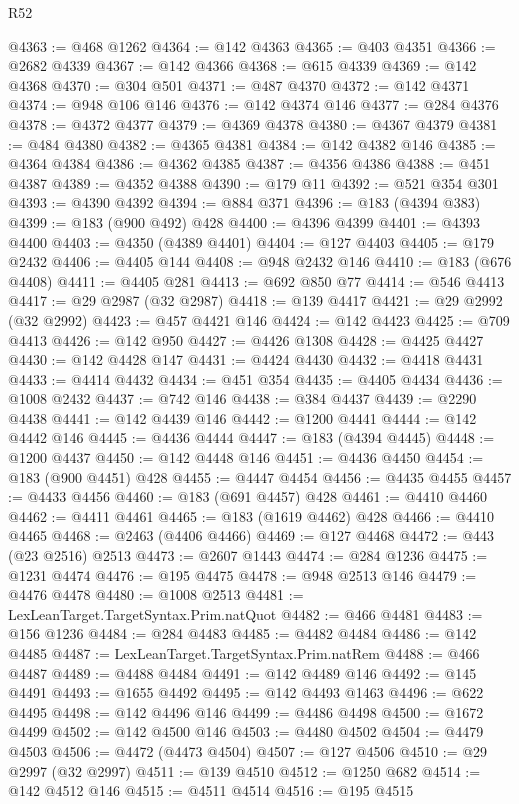 \begin{lexlean}{R52}
\begin{coremodule}
@4363 := @468 @1262
@4364 := @142 @4363
@4365 := @403 @4351
@4366 := @2682 @4339
@4367 := @142 @4366
@4368 := @615 @4339
@4369 := @142 @4368
@4370 := @304 @501
@4371 := @487 @4370
@4372 := @142 @4371
@4374 := @948 @106 @146
@4376 := @142 @4374 @146
@4377 := @284 @4376
@4378 := @4372 @4377
@4379 := @4369 @4378
@4380 := @4367 @4379
@4381 := @484 @4380
@4382 := @4365 @4381
@4384 := @142 @4382 @146
@4385 := @4364 @4384
@4386 := @4362 @4385
@4387 := @4356 @4386
@4388 := @451 @4387
@4389 := @4352 @4388
@4390 := @179 @11
@4392 := @521 @354 @301
@4393 := @4390 @4392
@4394 := @884 @371
@4396 := @183 (@4394 @383)
@4399 := @183 (@900 @492) @428
@4400 := @4396 @4399
@4401 := @4393 @4400
@4403 := @4350 (@4389 @4401)
@4404 := @127 @4403
@4405 := @179 @2432
@4406 := @4405 @144
@4408 := @948 @2432 @146
@4410 := @183 (@676 @4408)
@4411 := @4405 @281
@4413 := @692 @850 @77
@4414 := @546 @4413
@4417 := @29 @2987 (@32 @2987)
@4418 := @139 @4417
@4421 := @29 @2992 (@32 @2992)
@4423 := @457 @4421 @146
@4424 := @142 @4423
@4425 := @709 @4413
@4426 := @142 @950
@4427 := @4426 @1308
@4428 := @4425 @4427
@4430 := @142 @4428 @147
@4431 := @4424 @4430
@4432 := @4418 @4431
@4433 := @4414 @4432
@4434 := @451 @354
@4435 := @4405 @4434
@4436 := @1008 @2432
@4437 := @742 @146
@4438 := @384 @4437
@4439 := @2290 @4438
@4441 := @142 @4439 @146
@4442 := @1200 @4441
@4444 := @142 @4442 @146
@4445 := @4436 @4444
@4447 := @183 (@4394 @4445)
@4448 := @1200 @4437
@4450 := @142 @4448 @146
@4451 := @4436 @4450
@4454 := @183 (@900 @4451) @428
@4455 := @4447 @4454
@4456 := @4435 @4455
@4457 := @4433 @4456
@4460 := @183 (@691 @4457) @428
@4461 := @4410 @4460
@4462 := @4411 @4461
@4465 := @183 (@1619 @4462) @428
@4466 := @4410 @4465
@4468 := @2463 (@4406 @4466)
@4469 := @127 @4468
@4472 := @443 (@23 @2516) @2513
@4473 := @2607 @1443
@4474 := @284 @1236
@4475 := @1231 @4474
@4476 := @195 @4475
@4478 := @948 @2513 @146
@4479 := @4476 @4478
@4480 := @1008 @2513
@4481 := LexLeanTarget.TargetSyntax.Prim.natQuot
@4482 := @466 @4481
@4483 := @156 @1236
@4484 := @284 @4483
@4485 := @4482 @4484
@4486 := @142 @4485
@4487 := LexLeanTarget.TargetSyntax.Prim.natRem
@4488 := @466 @4487
@4489 := @4488 @4484
@4491 := @142 @4489 @146
@4492 := @145 @4491
@4493 := @1655 @4492
@4495 := @142 @4493 @1463
@4496 := @622 @4495
@4498 := @142 @4496 @146
@4499 := @4486 @4498
@4500 := @1672 @4499
@4502 := @142 @4500 @146
@4503 := @4480 @4502
@4504 := @4479 @4503
@4506 := @4472 (@4473 @4504)
@4507 := @127 @4506
@4510 := @29 @2997 (@32 @2997)
@4511 := @139 @4510
@4512 := @1250 @682
@4514 := @142 @4512 @146
@4515 := @4511 @4514
@4516 := @195 @4515

\end{coremodule}
\end{lexlean}
